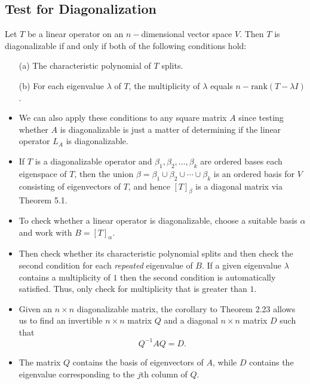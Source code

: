 \subsection{Test for Diagonalization}

\begin{prop}
    Let \( T  \) be a linear operator on an \( n- \)dimensional vector space \( V  \). Then \( T  \) is diagonalizable if and only if both of the following conditions hold:
    \begin{enumerate}
        \item[(a)] The characteristic polynomial of \( T  \) splits.
        \item[(b)] For each eigenvalue \( \lambda  \) of \( T  \), the multiplicity of \( \lambda  \) equals \( n - \text{rank}(T - \lambda I ) \).
    \end{enumerate}
\end{prop}
\begin{itemize}
    \item We can also apply these conditions to any square matrix \( A  \) since testing whether \( A  \) is diagonalizable is just a matter of determining if the linear operator \( {L}_{A} \) is diagonalizable.
    \item If \( T  \) is a diagonalizable operator and \( {\beta}_{1}, {\beta}_{2}, \dots, {\beta}_{k}  \) are ordered bases each eigenspace of \( T  \), then the union \( \beta = {\beta}_{1} \cup {\beta}_{2} \cup \cdots \cup {\beta}_{k } \) is an ordered basis for \( V  \) consisting of eigenvectors of \( T  \), and hence \( [T]_{\beta} \) is a diagonal matrix via Theorem 5.1.
    \item To check whether a linear operator is diagonalizable, choose a suitable basis \( \alpha \) and work with \( B = [T]_{\alpha} \).
    \item Then check whether its characteristic polynomial splits and then check the second condition for each \textit{repeated} eigenvalue of \( B  \). If a given eigenvalue \( \lambda    \) contains a multiplicity of \( 1  \) then the second condition is automatically satisfied. Thus, only check for multiplicity that is greater than \( 1  \). 
    \item Given an \( n \times n \) diagonalizable matrix, the corollary to Theorem 2.23 allows us to find an invertible \( n \times n  \) matrix \( Q  \) and a diagonal \( n \times n  \) matrix \( D  \) such that  
        \[  Q^{-1}A Q = D.  \]
    \item The matrix \( Q  \) contains the basis of eigenvectors of \( A  \), while \( D  \) contains the eigenvalue corresponding to the \( j \)th column of \( Q  \).
\end{itemize}

